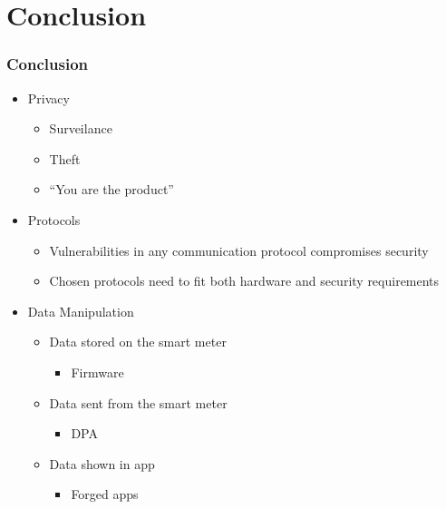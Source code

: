 
\section{Conclusion}

\begin{frame}
  \frametitle{Conclusion}

  \begin{itemize}
    \item Privacy
      \begin{itemize}
        \item Surveilance
        \item Theft
        \item ``You are the product''
      \end{itemize}
    \item Protocols
      \begin{itemize}
        \item Vulnerabilities in any communication protocol compromises security
        \item Chosen protocols need to fit both hardware and security requirements
      \end{itemize}
    \item Data Manipulation
    \begin{itemize}
      \item Data stored on the smart meter
      \begin{itemize}
        \item Firmware
      \end{itemize}
      \item Data sent from the smart meter
      \begin{itemize}
        \item DPA
      \end{itemize}
      \item Data shown in app
      \begin{itemize}
        \item Forged apps
      \end{itemize}
    \end{itemize}
  \end{itemize}
\end{frame}
